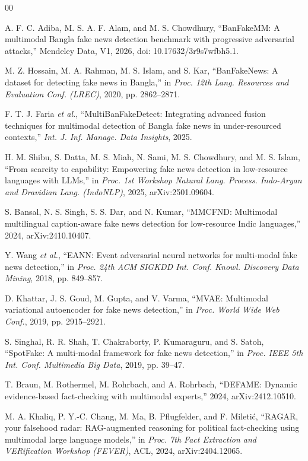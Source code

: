 \documentclass[journal]{IEEEtran}
\begin{document}
\begin{thebibliography}{00}

 A. F. C. Adiba, M. S. A. F. Alam, and M. S. Chowdhury,
``BanFakeMM: A multimodal Bangla fake news detection benchmark with progressive
adversarial attacks,'' Mendeley Data, V1, 2026, doi: 10.17632/3r9s7wfbh5.1.

 M. Z. Hossain, M. A. Rahman, M. S. Islam, and S. Kar,
``BanFakeNews: A dataset for detecting fake news in Bangla,'' in
\emph{Proc. 12th Lang. Resources and Evaluation Conf. (LREC)}, 2020,
pp. 2862--2871.

 F. T. J. Faria \emph{et al.}, ``MultiBanFakeDetect:
Integrating advanced fusion techniques for multimodal detection of Bangla fake
news in under-resourced contexts,'' \emph{Int. J. Inf. Manage. Data Insights},
2025.

 H. M. Shibu, S. Datta, M. S. Miah, N. Sami,
M. S. Chowdhury, and M. S. Islam, ``From scarcity to capability: Empowering
fake news detection in low-resource languages with LLMs,'' in
\emph{Proc. 1st Workshop Natural Lang. Process. Indo-Aryan and Dravidian Lang.
(IndoNLP)}, 2025, arXiv:2501.09604.

 S. Bansal, N. S. Singh, S. S. Dar, and N. Kumar, ``MMCFND:
Multimodal multilingual caption-aware fake news detection for low-resource
Indic languages,'' 2024, arXiv:2410.10407.

 Y. Wang \emph{et al.}, ``EANN: Event adversarial neural
networks for multi-modal fake news detection,'' in \emph{Proc. 24th ACM SIGKDD
Int. Conf. Knowl. Discovery Data Mining}, 2018, pp. 849--857.

 D. Khattar, J. S. Goud, M. Gupta, and V. Varma, ``MVAE:
Multimodal variational autoencoder for fake news detection,'' in \emph{Proc.
World Wide Web Conf.}, 2019, pp. 2915--2921.

 S. Singhal, R. R. Shah, T. Chakraborty, P. Kumaraguru, and
S. Satoh, ``SpotFake: A multi-modal framework for fake news detection,'' in
\emph{Proc. IEEE 5th Int. Conf. Multimedia Big Data}, 2019, pp. 39--47.

 T. Braun, M. Rothermel, M. Rohrbach, and A. Rohrbach,
``DEFAME: Dynamic evidence-based fact-checking with multimodal experts,''
2024, arXiv:2412.10510.

 M. A. Khaliq, P. Y.-C. Chang, M. Ma, B. Pflugfelder, and
F. Mileti\'{c}, ``RAGAR, your falsehood radar: RAG-augmented reasoning for
political fact-checking using multimodal large language models,'' in
\emph{Proc. 7th Fact Extraction and VERification Workshop (FEVER)}, ACL, 2024,
arXiv:2404.12065.


\end{thebibliography}
\end{document}
